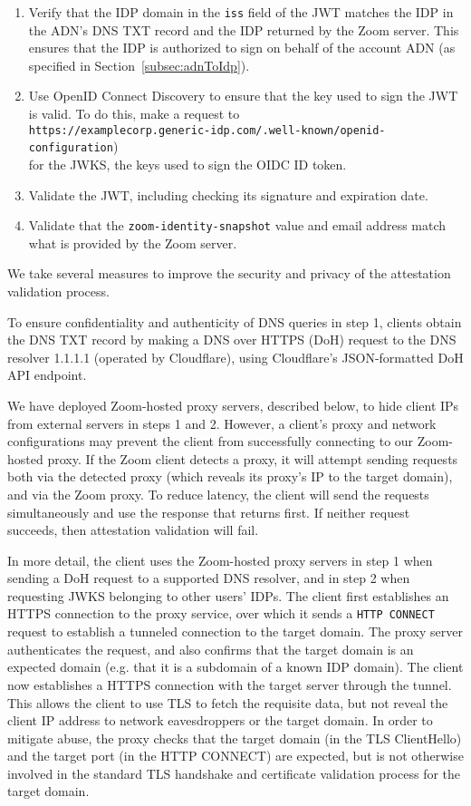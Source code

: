 \begin{enumerate}
\item Verify that the IDP domain in the \texttt{iss} field of the JWT matches
    the IDP in the ADN's DNS TXT record and the IDP returned by the Zoom server.
    This ensures that the IDP is authorized to sign on
    behalf of the account ADN (as specified in Section~\ref{subsec:adnToIdp}).
\item Use OpenID Connect Discovery to ensure that
the key used to sign the JWT is valid. To do this, make a request to \\
    \texttt{https://examplecorp.generic-idp.com/.well-known/openid-configuration}) \\
    for the JWKS, the keys used to sign the OIDC ID token.
\item Validate the JWT, including checking its signature and expiration date.
\item Validate that the \texttt{zoom-identity-snapshot} value and email address match what is provided by the Zoom server.
\end{enumerate}

We take several measures to improve the security and privacy of the attestation
validation process.

To ensure confidentiality and authenticity of DNS queries in step 1, clients
obtain the DNS TXT record by making a DNS over HTTPS (DoH) request to the DNS
resolver 1.1.1.1 (operated by Cloudflare), using Cloudflare's JSON-formatted DoH
API endpoint.

We have deployed Zoom-hosted proxy servers, described below, to hide client IPs
from external servers in steps 1 and 2. However, a client's proxy and network
configurations may prevent the client from successfully connecting to our
Zoom-hosted proxy. If the Zoom client detects a proxy, it will attempt sending
requests both via the detected proxy (which reveals its proxy's IP to the target
domain), and via the Zoom proxy. To reduce latency, the client will send the
requests simultaneously and use the response that returns first. If neither
request succeeds, then attestation validation will fail. 

In more detail, the client uses the Zoom-hosted proxy servers in step 1 when
sending a DoH request to a supported DNS resolver, and in step 2 when requesting
JWKS belonging to other users' IDPs. The client first establishes an HTTPS
connection to the proxy service, over which it sends a \texttt{HTTP CONNECT}
request to establish a tunneled connection to the target domain. The proxy
server authenticates the request, and also confirms that the target domain is an
expected domain (e.g. that it is a subdomain of a known IDP domain). The client
now establishes a HTTPS connection with the target server through the tunnel.
This allows the client to use TLS to fetch the requisite data, but not reveal
the client IP address to network eavesdroppers or the target domain. 
In order to mitigate abuse, the proxy checks that the target domain (in the TLS
ClientHello) and the target port (in the HTTP CONNECT) are expected, but is not
otherwise involved in the standard TLS handshake and certificate validation
process for the target domain.


